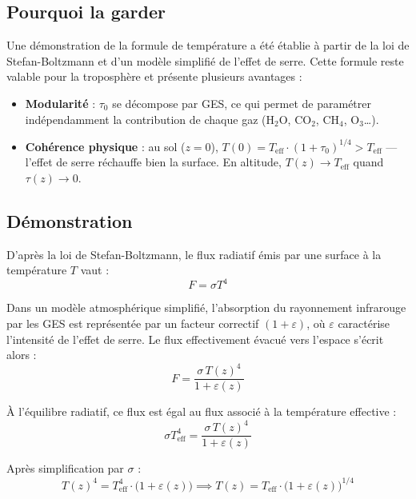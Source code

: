 \documentclass[a4paper,11pt]{article}
\begin{document}
\subsection{Pourquoi la garder}

Une démonstration de la formule de température a été établie à partir
de la loi de Stefan-Boltzmann et d'un modèle simplifié de l'effet de serre.
Cette formule reste valable pour la troposphère et présente plusieurs avantages :

\begin{itemize}
  \item \textbf{Modularité} : $\tau_0$ se décompose par GES, ce qui permet de
        paramétrer indépendamment la contribution de chaque gaz
        ($\mathrm{H_2O}$, $\mathrm{CO_2}$, $\mathrm{CH_4}$, $\mathrm{O_3}$\ldots).
  \item \textbf{Cohérence physique} : au sol ($z = 0$),
        $T(0) = T_{\mathrm{eff}} \cdot (1 + \tau_0)^{1/4} > T_{\mathrm{eff}}$ —
        l'effet de serre réchauffe bien la surface. En altitude,
        $T(z) \to T_{\mathrm{eff}}$ quand $\tau(z) \to 0$.
\end{itemize}

\subsection{Démonstration}

D'après la loi de Stefan-Boltzmann, le flux radiatif émis par une surface à la
température $T$ vaut :
\begin{equation}
  F = \sigma T^4
\end{equation}

Dans un modèle atmosphérique simplifié, l'absorption du rayonnement infrarouge
par les GES est représentée par un facteur correctif $(1 + \varepsilon)$, où
$\varepsilon$ caractérise l'intensité de l'effet de serre. Le flux effectivement
évacué vers l'espace s'écrit alors :
\begin{equation}
  F = \frac{\sigma\, T(z)^4}{1 + \varepsilon(z)}
\end{equation}

À l'équilibre radiatif, ce flux est égal au flux associé à la température effective :
\begin{equation}
  \sigma T_{\mathrm{eff}}^4 = \frac{\sigma\, T(z)^4}{1 + \varepsilon(z)}
\end{equation}

Après simplification par $\sigma$ :
\begin{equation}
  T(z)^4 = T_{\mathrm{eff}}^4 \cdot \bigl(1 + \varepsilon(z)\bigr)
  \implies
  T(z) = T_{\mathrm{eff}} \cdot \bigl(1 + \varepsilon(z)\bigr)^{1/4}
\end{equation}
\end{document}
